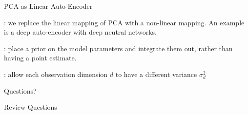 \documentclass[handout,fleqn,aspectratio=169]{beamer}
\begin{document}
\begin{frame}{PCA as Linear Auto-Encoder}


\vspace{-0.7cm}
\plitemsep 0.07in
\bci 
\item {}: we replace the linear mapping of PCA with a non-linear mapping. An example is a deep auto-encoder with deep neutral networks.
\item {}: place a prior on the model parameters and integrate them out, rather than having a point estimate.
\item {}: allow each observation dimension $d$ to have a different variance $\sigma_d^2$
\eci
\end{frame}


\begin{frame}{}
\vspace{2cm}
\LARGE Questions?


\end{frame}

\begin{frame}{Review Questions}
\bce[1)]
\item 

\ece
\end{frame}
\end{document}
